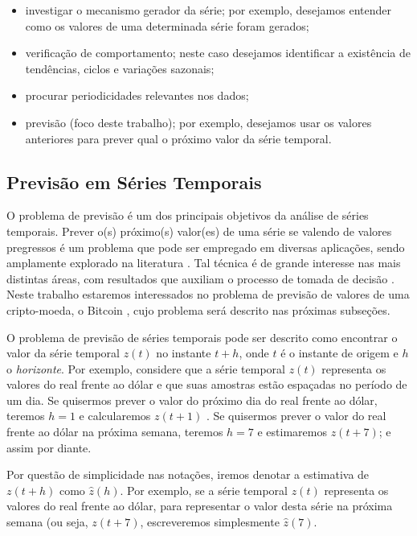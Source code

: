 \begin{itemize}
\item investigar o mecanismo gerador da série; por exemplo, desejamos entender como os valores de uma determinada série foram gerados;
\item verificação de comportamento; neste caso desejamos identificar a existência de tendências, ciclos e variações sazonais;
\item procurar periodicidades relevantes nos dados;
\item previsão (foco deste trabalho); por exemplo, desejamos usar os valores anteriores para prever qual o próximo valor da série temporal.
\end{itemize}

\subsection{Previsão em Séries Temporais}

O problema de previsão é um dos principais objetivos da análise de séries temporais. Prever o(s) próximo(s) valor(es) de uma série se valendo de valores pregressos é um problema que pode ser empregado em diversas aplicações, sendo amplamente explorado na literatura \cite{weigend2018time}. Tal técnica é de grande interesse nas mais distintas áreas, com resultados que auxiliam o processo de tomada de decisão \cite{morettin2006analise, hyndman2018forecasting}. Neste trabalho estaremos interessados no problema de previsão de valores de uma cripto-moeda, o Bitcoin \cite{nakamoto2008bitcoin}, cujo problema será descrito nas próximas subseções.

O problema de previsão de séries temporais pode ser descrito como encontrar o valor da série temporal $z(t)$ no instante $t + h$, onde $t$ é o instante de origem e $h$ o \textit{horizonte}. Por exemplo, considere que a série temporal $z(t)$ representa os valores do real frente ao dólar e que suas amostras estão espaçadas no período de um dia. Se quisermos prever o valor do próximo dia do real frente ao dólar, teremos $h = 1$ e calcularemos $z(t + 1)$ . Se quisermos prever o valor do real frente ao dólar na próxima semana, teremos $h = 7$ e estimaremos $z(t + 7)$; e assim por diante. 

Por questão de simplicidade nas notações, iremos denotar a estimativa de $z(t+h)$ como $\hat{z}(h)$. Por exemplo, se a série temporal $z(t)$ representa os valores do real frente ao dólar, para representar o valor desta série na próxima semana (ou seja, $z(t + 7)$, escreveremos simplesmente $\hat{z}(7)$. 

